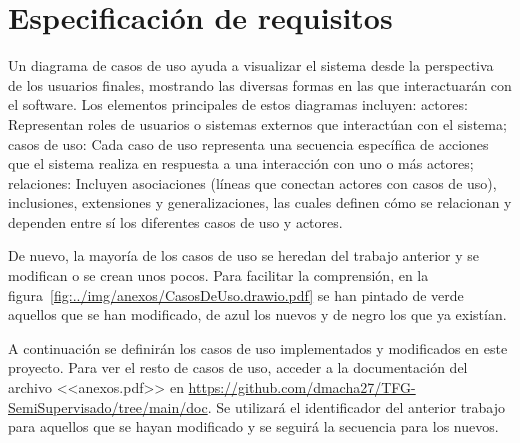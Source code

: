 \section{Especificación de requisitos}
Un diagrama de casos de uso ayuda a visualizar el sistema desde la perspectiva de los usuarios finales, mostrando las diversas formas en las que interactuarán con el software. Los elementos principales de estos diagramas incluyen: actores: Representan roles de usuarios o sistemas externos que interactúan con el sistema; casos de uso: Cada caso de uso representa una secuencia específica de acciones que el sistema realiza en respuesta a una interacción con uno o más actores; relaciones: Incluyen asociaciones (líneas que conectan actores con casos de uso), inclusiones, extensiones y generalizaciones, las cuales definen cómo se relacionan y dependen entre sí los diferentes casos de uso y actores.

De nuevo, la mayoría de los casos de uso se heredan del trabajo anterior y se modifican o se crean unos pocos. Para facilitar la comprensión, en la figura~\ref{fig:../img/anexos/CasosDeUso.drawio.pdf} se han pintado de verde aquellos que se han modificado, de azul los nuevos y de negro los que ya existían.


A continuación se definirán los casos de uso implementados y modificados en este proyecto. Para ver el resto de casos de uso, acceder a la documentación del archivo <<anexos.pdf>> en \url{https://github.com/dmacha27/TFG-SemiSupervisado/tree/main/doc}. Se utilizará el identificador del anterior trabajo para aquellos que se hayan modificado y se seguirá la secuencia para los nuevos.


